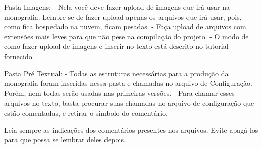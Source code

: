 Pasta Imagens:
- Nela você deve fazer upload de imagens que irá usar na monografia. Lembre-se de fazer upload apenas os arquivos que irá usar, pois, como fica hospedado na nuvem, ficam pesadas.
- Faça upload de arquivos com extensões mais leves para que não pese na compilação do projeto.
- O modo de como fazer upload de imagens e inserir no texto está descrito no tutorial fornecido.

Pasta Pré Textual:
- Todas as estruturas necessárias para a produção da monografia foram inseridas nessa pasta e chamadas no arquivo de Configuração. Porém, nem todas serão usadas nas primeiras versões.
- Para chamar esses arquivos no texto, basta procurar suas chamadas no arquivo de configuração que estão comentadas, e retirar o símbolo do comentário.

Leia sempre as indicações dos comentários presentes nos arquivos. Evite apagá-los para que possa se lembrar deles depois.
